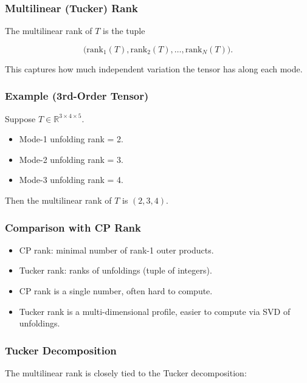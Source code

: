 \documentclass[
  letterpaper,
  DIV=11,
  numbers=noendperiod]{scrreprt}
\providecommand{\tightlist}{%
  \setlength{\itemsep}{0pt}\setlength{\parskip}{0pt}}
\begin{document}
\subsubsection{Multilinear (Tucker) Rank}\label{multilinear-tucker-rank}

The multilinear rank of \(T\) is the tuple

\[
\big( \text{rank}_1(T), \text{rank}_2(T), \dots, \text{rank}_N(T) \big).
\]

This captures how much independent variation the tensor has along each
mode.

\subsubsection{Example (3rd-Order
Tensor)}\label{example-3rd-order-tensor-1}

Suppose \(T \in \mathbb{R}^{3 \times 4 \times 5}\).

\begin{itemize}
\tightlist
\item
  Mode-1 unfolding rank = 2.
\item
  Mode-2 unfolding rank = 3.
\item
  Mode-3 unfolding rank = 4.
\end{itemize}

Then the multilinear rank of \(T\) is \((2,3,4)\).

\subsubsection{Comparison with CP Rank}\label{comparison-with-cp-rank}

\begin{itemize}
\tightlist
\item
  CP rank: minimal number of rank-1 outer products.
\item
  Tucker rank: ranks of unfoldings (tuple of integers).
\item
  CP rank is a single number, often hard to compute.
\item
  Tucker rank is a multi-dimensional profile, easier to compute via SVD
  of unfoldings.
\end{itemize}

\subsubsection{Tucker Decomposition}\label{tucker-decomposition}

The multilinear rank is closely tied to the Tucker decomposition:
\end{document}
